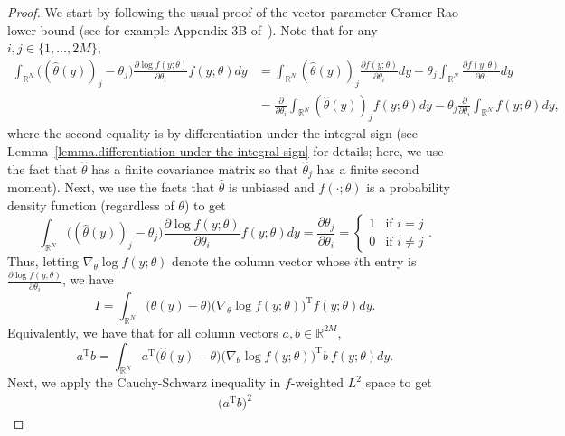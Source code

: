 \documentclass[times,10pt]{elsarticle}
\theoremstyle{plain}
\begin{document}
\begin{proof}
We start by following the usual proof of the vector parameter Cramer-Rao lower bound (see for example Appendix 3B of~\cite{Kay:93}).
Note that for any $i,j\in\{1,\ldots,2M\}$,
\begin{align*}
\int_{\mathbb{R}^N}\big((\hat{\theta}(y))_j-\theta_j\big)\frac{\partial\log f(y;\theta)}{\partial\theta_i}f(y;\theta)dy
&=\int_{\mathbb{R}^N}(\hat{\theta}(y))_j\frac{\partial f(y;\theta)}{\partial\theta_i}dy-\theta_j\int_{\mathbb{R}^N}\frac{\partial f(y;\theta)}{\partial\theta_i}dy\\
&=\frac{\partial}{\partial\theta_i}\int_{\mathbb{R}^N}(\hat{\theta}(y))_jf(y;\theta)dy-\theta_j\frac{\partial}{\partial\theta_i}\int_{\mathbb{R}^N}f(y;\theta)dy,
\end{align*}
where the second equality is by differentiation under the integral sign (see Lemma~\ref{lemma.differentiation under the integral sign} for details; here, we use the fact that $\hat{\theta}$ has a finite covariance matrix so that $\hat{\theta}_j$ has a finite second moment).
Next, we use the facts that $\hat{\theta}$ is unbiased and $f(\cdot;\theta)$ is a probability density function (regardless of $\theta$) to get
\begin{equation*}
\int_{\mathbb{R}^N}\big((\hat{\theta}(y))_j-\theta_j\big)\frac{\partial\log f(y;\theta)}{\partial\theta_i}f(y;\theta)dy
=\frac{\partial \theta_j}{\partial \theta_i}
=\left\{
\begin{array}{ll}
1&\mbox{if } i=j\\
0&\mbox{if } i\neq j
\end{array}
\right.
.
\end{equation*}
Thus, letting $\nabla_\theta\log f(y;\theta)$ denote the column vector whose $i$th entry is $\frac{\partial\log f(y;\theta)}{\partial\theta_i}$,
we have
\begin{equation*}
I
=\int_{\mathbb{R}^N}\big(\hat{\theta}(y)-\theta\big)\big(\nabla_\theta\log f(y;\theta)\big)^\mathrm{T}f(y;\theta)dy.
\end{equation*}
Equivalently, we have that for all column vectors $a,b\in\mathbb{R}^{2M}$,
\begin{equation*}
a^\mathrm{T}b
=\int_{\mathbb{R}^N}a^\mathrm{T}\big(\hat{\theta}(y)-\theta\big)\big(\nabla_\theta\log f(y;\theta)\big)^\mathrm{T}b~f(y;\theta)dy.
\end{equation*}
Next, we apply the Cauchy-Schwarz inequality in $f$-weighted $L^2$ space to get
\begin{align*}
\big(a^\mathrm{T}b\big)^2

\end{align*}
\end{proof}
\end{document}
